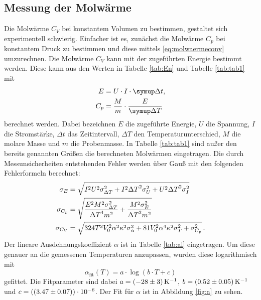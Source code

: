 \subsection{Messung der Molwärme}
Die Molwärme $C_V$ bei konstantem Volumen zu bestimmen, gestaltet sich experimentell schwierig. Einfacher ist es, zunächst die Molwärme $C_p$ bei konstantem Druck zu bestimmen und diese mittels \eqref{eq:molwaermeconv}
umzurechnen. 
Die Molwärme $C_V$ kann mit der zugeführten Energie bestimmt werden. Diese kann aus den Werten in Tabelle \ref{tab:En} und Tabelle \ref{tab:tab1} mit
\begin{align}
	E &= U \cdot I \cdot \symup\Delta t,\\
	C_p &= \frac{M}{m}\cdot\frac{E}{\symup\Delta T}
	\label{eqn:cp}
\end{align}
berechnet werden. Dabei bezeichnen $E$ die zugeführte Energie, $U$ die Spannung, $I$ die Stromstärke, $\Delta t$ das Zeitintervall, $\Delta T$ den Temperaturunterschied, $M$ die molare Masse und $m$ die Probenmasse. In Tabelle \ref{tab:tab1} sind außer den bereits genannten Größen die berechneten Molwärmen eingetragen.
Die durch Messunsicherheiten entstehenden Fehler werden über Gauß mit den folgenden Fehlerformeln berechnet:
\begin{align*}
	\sigma_E &= \sqrt{I^{2} U^{2} \sigma_{{\Delta T}}^{2} + I^{2} {\Delta T}^{2} \sigma_{U}^{2} + U^{2} {\Delta T}^{2} \sigma_{I}^{2}}\\
	\sigma_{C_p} &= \sqrt{\frac{E^{2} M^{2} \sigma_{{\Delta T}}^{2}}{{\Delta T}^{4} m^{2}} +\frac{M^{2} \sigma_{E}^{2}}{{\Delta T}^{2} m^{2}}}\\
	\sigma_{C_V} &= \sqrt{324 T^{2} V_{0}^{2} \alpha^{2} \kappa^{2} \sigma_{\alpha}^{2} + 81 V_{0}^{2} \alpha^{4} \kappa^{2} \sigma_{T}^{2} + \sigma_{C_{p}}^{2}}\,\text.
\end{align*}
Der lineare Ausdehnungskoeffizient $\alpha$ ist in Tabelle \ref{tab:al} eingetragen. Um diese genauer an die gemessenen Temperaturen anzupassen, wurden diese logarithmisch mit
\begin{equation*}
	\alpha_\text{fit}(T) = a\cdot\log{(b\cdot T + c)}
\end{equation*}
gefittet. Die Fitparameter sind dabei $a = \SI{-28 \pm 3}{\per\kelvin}$, $b = \SI{0.52\pm0.05}{\per\kelvin}$ und $c = (\SI{3.47\pm0.07}{})\cdot 10^{-6}$.
Der Fit für $\alpha$ ist in Abbildung \ref{fig:a} zu sehen.
